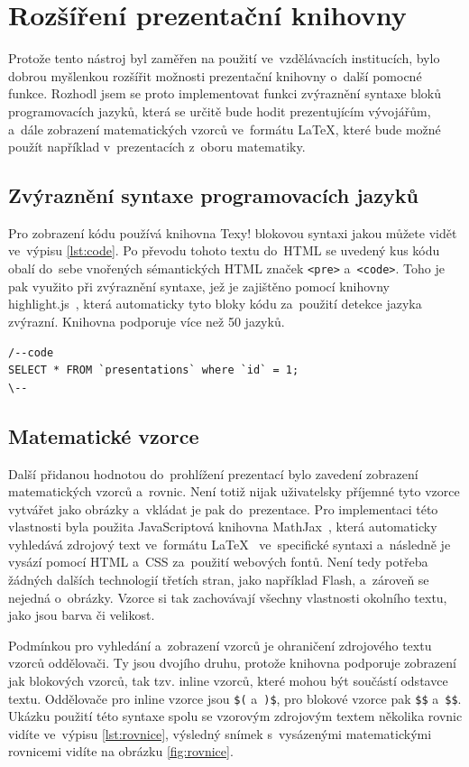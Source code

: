\documentclass[11pt,twoside,a4paper]{book}
\begin{document}
\section{Rozšíření prezentační knihovny}
Protože tento nástroj byl zaměřen na použití ve~vzdělávacích institucích, bylo dobrou myšlenkou rozšířit možnosti prezentační knihovny o~další pomocné funkce. Rozhodl jsem se proto imple\-mentovat funkci zvýraznění syntaxe bloků programovacích jazyků, která se určitě bude hodit prezentujícím vývojářům, a~dále zobrazení matematických vzorců ve~formátu \LaTeX, které bude možné použít například v~prezentacích z~oboru matematiky.

\subsection{Zvýraznění syntaxe programovacích jazyků}
Pro zobrazení kódu používá knihovna Texy! blokovou syntaxi jakou můžete vidět ve~výpisu \ref{lst:code}. Po převodu tohoto textu do~HTML se uvedený kus kódu obalí do~sebe vnořených sémantických HTML značek \verb|<pre>| a~\verb|<code>|. Toho je pak využito při zvýraznění syntaxe, jež je zajištěno pomocí knihovny highlight.js~\cite{highlight}, která automaticky tyto bloky kódu za~použití detekce jazyka zvýrazní. Knihovna podporuje více než 50 jazyků.

\begin{lstlisting}[caption={Ukázka blokové syntaxe pro výpis kódu},label={lst:code},captionpos=b]
/--code
SELECT * FROM `presentations` where `id` = 1;
\--
\end{lstlisting}


\subsection{Matematické vzorce}
Další přidanou hodnotou do~prohlížení prezentací bylo zavedení zobrazení matematických vzorců a~rovnic. Není totiž nijak uživatelsky příjemné tyto vzorce vytvářet jako obrázky a~vkládat je pak do~prezentace. Pro imple\-mentaci této vlastnosti byla použita Java\-Scriptová knihovna MathJax~\cite{mathjax}, která automaticky vyhledává zdrojový text ve~formátu \LaTeX~\cite{latex} ve~specifické syntaxi a~následně je vysází pomocí HTML a~CSS za~použití webových fontů. Není tedy potřeba žádných dalších technologií třetích stran, jako například Flash, a~zároveň se nejedná o~obrázky. Vzorce si tak zachovávají všechny vlastnosti okolního textu, jako jsou barva či velikost.

Podmínkou pro vyhledání a~zobrazení vzorců je ohraničení zdrojového textu vzorců oddělovači. Ty jsou dvojího druhu, protože knihovna podporuje zobrazení jak blokových vzorců, tak tzv. inline vzorců, které mohou být součástí odstavce textu. Oddělovače pro inline vzorce jsou \verb|$(| a~\verb|)$|, pro blokové vzorce pak \verb|$$| a~\verb|$$|. Ukázku použití této syntaxe spolu se vzorovým zdrojovým textem několika rovnic vidíte ve~výpisu \ref{lst:rovnice}, výsledný snímek s~vysázenými matematickými rovnicemi vidíte na obrázku \ref{fig:rovnice}.
\end{document}
